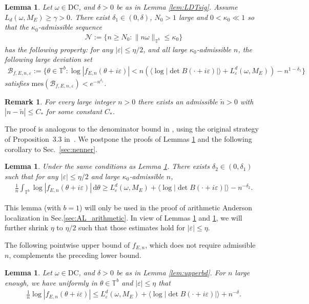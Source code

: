\documentclass[11pt]{amsart}
\newtheorem{lemma}[theorem]{Lemma}
\newtheorem{remark}[theorem]{Remark}
\newcommand{\T}{\mathbb T}
\def\tor{\mathbb{T}}
\begin{document}
\begin{lemma}\label{lem:deno}
Let $\omega\in \mathrm{DC}$, and $\delta>0$ be as in Lemma \ref{lem:LDTsig}.
Assume $L_d(\omega,M_E)\geq \gamma>0$.
There exist $\delta_1\in (0,\delta)$, $N_0>1$ large and $0<\kappa_0\ll 1$ so that the {\it $\kappa_0$-admissible} sequence 
\begin{align}\label{def:admissible}
\mathcal{N}:=\{n\geq N_0: \|n\omega\|_{\tor^b}\leq \kappa_0\}
\end{align}
has the following property: 
for any $|\varepsilon|\leq \eta/2$, and all large $\kappa_0$-admissible $n$, the following large deviation set 
\begin{align}\label{def:B_fEn}
\mathcal{B}_{f,E,n,\varepsilon}:=
\big\{\theta\in \tor^b: \log |f_{E,n}(\theta+i\varepsilon)|<n(\langle \log |\det B(\cdot+i\varepsilon)|\rangle +{L}^d_{\varepsilon}(\omega,M_E)) - n^{1-\delta_1}\big\}
\end{align}
satisfies $\mathrm{mes}(\mathcal{B}_{f,E,n,\varepsilon})<e^{-n^{\delta_1}}$.
\end{lemma}
\begin{remark}\label{rem:admissible}
    For every large integer $n>0$ there exists an admissible $\tilde n>0$ with $|n-\tilde n|\le C_*$ for some constant $C_*$.
\end{remark}

The proof is analogous to the denominator bound in \cite{HS3}, using the original strategy of Proposition~3.3 in~\cite{GS2}. 
We postpone the proofs of Lemmas \ref{lem:deno} and the following corollary to Sec.~\ref{sec:nenner}.
\begin{lemma}\label{lem:fn_ave}
Under the same conditions as Lemma \ref{lem:deno}.
There exists $\delta_2\in (0,\delta_1)$ such that for any $|\varepsilon|\leq \eta/2$ and large $\kappa_0$-admissible $n$, 
\begin{align}
\frac{1}{n} \int_{\T^b}\log |f_{E,n}(\theta+i\varepsilon)|\, \mathrm{d}\theta\geq L^d_{\varepsilon}(\omega,M_E)+\langle \log |\det B(\cdot+i\varepsilon)|\rangle -n^{-\delta_2}.
\end{align}
\end{lemma}
This lemma (with $b=1$) will only be used in the proof of arithmetic Anderson localization in Sec.\ref{sec:AL_arithmetic}. 
In view of Lemmas \ref{lem:deno} and \ref{lem:fn_ave}, we will further shrink $\eta$ to $\eta/2$ such that those estimates hold for $|\varepsilon|\leq \eta$.

The following pointwise upper bound of $f_{E,n}$, which does not require admissible~$n$, complements the preceding lower bound.
\begin{lemma}\label{lem:fn_upper}
Let $\omega\in \mathrm{DC}$, and $\delta>0$ be as in Lemma \ref{lem:upperbd}. For $n$ large enough, we have uniformly in $\theta\in \T^b$ and $|\varepsilon|\leq \eta$ that
    \begin{align}
\frac{1}{n}\log |f_{E,n}(\theta+i\varepsilon)|\leq L^d_{\varepsilon}(\omega,M_E)+\langle \log |\det B(\cdot+i\varepsilon)|\rangle+n^{-\delta}.
    \end{align}
\end{lemma}
\end{document}
